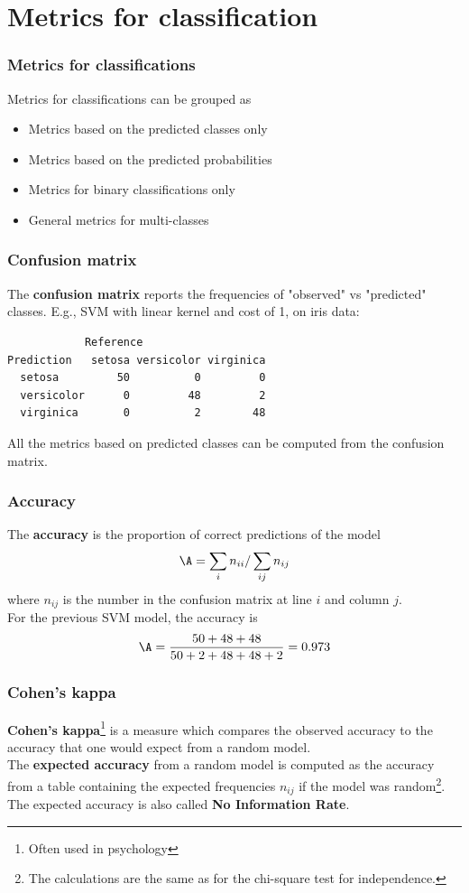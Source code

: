 \section{Metrics for classification}
\begin{frame}
\frametitle{Metrics for classifications}
Metrics for classifications can be grouped as
\begin{itemize}
\item Metrics based on the predicted classes only
\item Metrics based on the predicted probabilities
\item Metrics for binary classifications only
\item General metrics for multi-classes 
\end{itemize}
\end{frame}
\begin{frame}[fragile]
\frametitle{Confusion matrix}
The {\bf confusion matrix} reports the frequencies of "observed" vs "predicted" classes. E.g., SVM with linear kernel and cost of 1, on iris data:\\
\scriptsize
\begin{verbatim}
            Reference
Prediction   setosa versicolor virginica
  setosa         50          0         0
  versicolor      0         48         2
  virginica       0          2        48
\end{verbatim}
\normalsize
All the metrics based on predicted classes can be computed from the confusion matrix. 
\end{frame}
\begin{frame}
\frametitle{Accuracy}
The {\bf accuracy} is the proportion of correct predictions of the model
$$
\A = \sum_i n_{ii}/\sum_{ij} n_{ij} 
$$
where $n_{ij}$ is the number in the confusion matrix at line $i$ and column $j$.\\
\vspace{0.3cm}
For the previous SVM model, the accuracy is
$$
\A = \frac{50+48+48}{50+2+48+48+2} = 0.973
$$
\end{frame}
\begin{frame}
\frametitle{Cohen's kappa}
{\bf Cohen's kappa}\footnote{Often used in psychology} is a measure which compares the observed accuracy to the accuracy that one would expect from a random model.\\ 
\vspace{0.2cm}
The {\bf expected accuracy} from a random model is computed as the accuracy from a table containing the expected frequencies $n_{ij}$ if the model was random\footnote{The calculations are the same as for the chi-square test for independence.}. The expected accuracy is also called {\bf No Information Rate}.
\end{frame}

